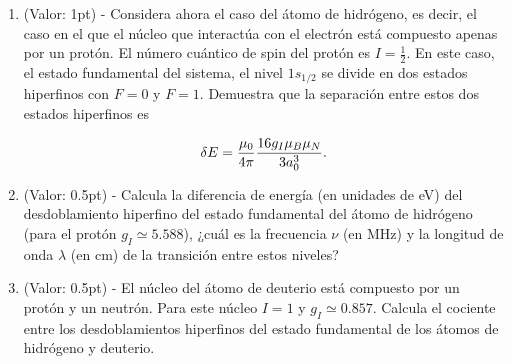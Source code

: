 \documentclass[./../main.tex]{subfiles}
\begin{document}
\begin{exercise}
\begin{enumerate}
            \item (Valor: 1pt) - Considera ahora el caso del átomo de hidrógeno, es decir, el caso en el que el núcleo que interactúa con el electrón está compuesto apenas por un protón. El número cuántico de spin del protón es \(I = \tfrac{1}{2}\). En este caso, el estado fundamental del sistema, el nivel \(1s_{1/2}\) se divide en dos estados hiperfinos con \(F = 0\) y \(F = 1\). Demuestra que la separación entre estos dos estados hiperfinos es
            
            \begin{equation*}
                \fdif{E} = \dfrac{\mu_{0}}{4\pi}\dfrac{16g_{I}\mu_{B}\mu_{N}}{3a_{0}^{3}}.
            \end{equation*}

        \item (Valor: 0.5pt) - Calcula la diferencia de energía (en unidades de \unit{\eV}) del desdoblamiento hiperfino del estado fundamental del átomo de hidrógeno (para el protón \(g_{I} \simeq \num{5.588}\)), ¿cuál es la frecuencia \(\nu\) (en \unit{\MHz}) y la longitud de onda \(\lambda\) (en \unit{\cm}) de la transición entre estos niveles?
        
        \item (Valor: 0.5pt) - El núcleo del átomo de deuterio está compuesto por un protón y un neutrón. Para este núcleo \(I = 1\) y \(g_{I} \simeq \num{0.857}\). Calcula el cociente entre los desdoblamientos hiperfinos del estado fundamental de los átomos de hidrógeno y deuterio.
        \end{enumerate}
    \end{exercise}
\end{document}
